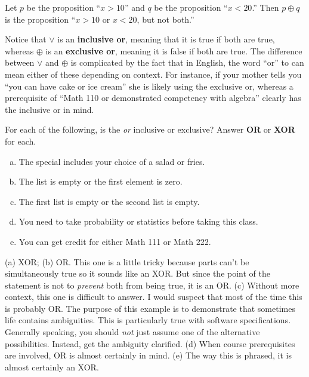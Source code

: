 \vspace*{-.1in} %

\begin{exa}
Let $p$ be the proposition ``$x>10$'' and $q$ be the proposition ``$x<20$.''
Then $p\oplus q$ is the proposition ``$x>10$ or $x<20$, but not both.''
\end{exa}

\vspace*{-.1in} %

\begin{rem}
Notice that $\vee$ is an {\bf inclusive or}, meaning that it is true if both are true, 
whereas  $\oplus$ is an {\bf exclusive or}, meaning it is false if both are true.
The difference between $\vee$ and $\oplus$ is complicated by the fact that in English,
 the word ``or'' to can mean either of these depending on context.  For instance, if your mother
tells you ``you can have cake or ice cream'' she is likely using the exclusive or, 
whereas a prerequisite of ``Math 110 or demonstrated competency with algebra'' clearly
has the inclusive or in mind.
\end{rem}


\begin{exer}
For each of the following, is the {\em or} inclusive or exclusive?  
Answer {\bf OR} or {\bf XOR} for each.
\begin{enumerate}[(a)]
\item {} The special includes your choice of a salad or fries.
\item {} The list is empty or the first element is zero.
\item {} The first list is empty or the second list is empty.
\item {} You need to take probability or statistics before taking this class.
\item {} You can get credit for either Math 111 or Math 222.
\end{enumerate}
\begin{answer}
(a) XOR; 
(b) OR.  This one is a little tricky because parts can't be simultaneously true
so it sounds like an XOR.  But since the point of the statement is not to {\em prevent}
both from being true, it is an OR.
(c) Without more context, this one is difficult to answer.  I would suspect that most
of the time this is probably OR.  The purpose of this example is to demonstrate that
sometimes life contains ambiguities.  This is particularly true with software specifications.
Generally speaking, you should {\em not} just assume one of the alternative possibilities.
Instead, get the ambiguity clarified.
(d) When course prerequisites are involved, OR is almost certainly in mind.
(e) The way this is phrased, it is almost certainly an XOR.
\end{answer}
\end{exer}



